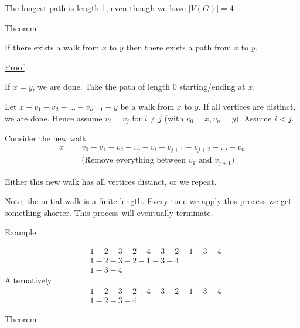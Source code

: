 \documentclass{article}
\begin{document}
The longest path is length 1, even though we have $|V(G)| = 4$

\underline{Theorem}

If there exists a walk from $x$ to $y$ then there exists a path from $x$ to $y$. 

\underline{Proof}

If $x = y$, we are done. Take the path of length 0 starting/ending at $x$.

Let $x-v_1-v_2-\ldots-v_{n-1}-y$ be a walk from $x$ to $y$. If all vertices are distinct, we are done. Hence assume $v_i = v_j$ for $i \ne j$ (with $v_0 = x, v_n = y)$. Assume $i < j$.

Consider the new walk
\begin{align*}
    x = &v_0 - v_1 - v_2 - \ldots - v_i - v_{j+1} - v_{j+2} - \ldots - v_n\\
    &\text{(Remove everything between } v_1 \text{ and } v_{j+1} \text{)}
\end{align*}

Either this new walk has all vertices distinct, or we repeat. 

Note, the initial walk is a finite length. Every time we apply this process we get something shorter. This process will eventually terminate. 

\underline{Example}

\begin{center}
\end{center}

\begin{align*}
&1-2-3-2-4-3-2-1-3-4\\
&1-2-3-2-1-3-4\\
&1-3-4
\end{align*}
Alternatively
\begin{align*}
    &1-2-3-2-4-3-2-1-3-4 \\
    &1-2-3-4
\end{align*}

\underline{Theorem}
\end{document}
